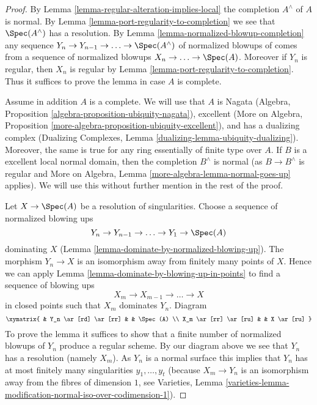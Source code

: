 \begin{proof}
By Lemma \ref{lemma-regular-alteration-implies-local}
the completion $A^\wedge$ of $A$ is normal.
By Lemma \ref{lemma-port-regularity-to-completion} we see
that $\Spec(A^\wedge)$ has a resolution.
By Lemma \ref{lemma-normalized-blowup-completion}
any sequence $Y_n \to Y_{n - 1} \to \ldots \to \Spec(A^\wedge)$
of normalized blowups of comes from a sequence of normalized
blowups $X_n \to \ldots \to \Spec(A)$. Moreover if $Y_n$ is
regular, then $X_n$ is regular by
Lemma \ref{lemma-port-regularity-to-completion}.
Thus it suffices to prove the lemma in case $A$ is complete.

\medskip\noindent
Assume in addition $A$ is a complete. We will use that $A$ is Nagata
(Algebra, Proposition \ref{algebra-proposition-ubiquity-nagata}),
excellent (More on Algebra, Proposition
\ref{more-algebra-proposition-ubiquity-excellent}),
and has a dualizing complex
(Dualizing Complexes, Lemma \ref{dualizing-lemma-ubiquity-dualizing}).
Moreover, the same is true for any ring essentially of finite type over $A$.
If $B$ is a excellent local normal domain, then the completion
$B^\wedge$ is normal (as $B \to B^\wedge$ is regular and
More on Algebra, Lemma \ref{more-algebra-lemma-normal-goes-up} applies).
We will use this without further mention in the rest of the proof.

\medskip\noindent
Let $X \to \Spec(A)$ be a resolution of singularities.
Choose a sequence of normalized blowing ups
$$
Y_n \to Y_{n - 1} \to \ldots \to Y_1 \to \Spec(A)
$$
dominating $X$ (Lemma \ref{lemma-dominate-by-normalized-blowing-up}).
The morphism $Y_n \to X$ is an isomorphism away from
finitely many points of $X$.
Hence we can apply Lemma \ref{lemma-dominate-by-blowing-up-in-points}
to find a sequence of blowing ups
$$
X_m \to X_{m - 1} \to \ldots \to X
$$
in closed points such that $X_m$ dominates $Y_n$. Diagram
$$
\xymatrix{
& Y_n \ar[rd] \ar[rr] & & \Spec(A) \\
X_m \ar[rr] \ar[ru] & & X \ar[ru]
}
$$
To prove the lemma it suffices to show that a finite number of normalized
blowups of $Y_n$ produce a regular scheme. By our diagram above we see that
$Y_n$ has a resolution (namely $X_m$). As $Y_n$ is a normal surface
this implies that $Y_n$ has at most finitely many singularities
$y_1, \ldots, y_t$ (because $X_m \to Y_n$ is an isomorphism away from
the fibres of dimension $1$, see Varieties, Lemma
\ref{varieties-lemma-modification-normal-iso-over-codimension-1}).


\end{proof}
